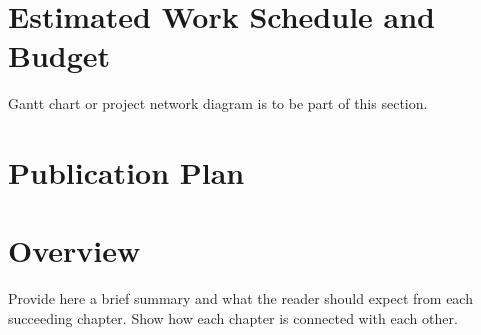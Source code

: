 \ifFinished
\else

\section{Estimated Work Schedule and Budget}

Gantt chart or project network diagram is to be part of this section.

\textcolor[rgb]{0.75,0.75,0.75}{\blindtext}

\ifPhD
\section{Publication Plan}
\textcolor[rgb]{0.75,0.75,0.75}{\blindtext}
\fi

\fi


\section{Overview}

Provide here a brief summary and what the reader should expect from each succeeding chapter.  Show how each chapter is connected with each other.


